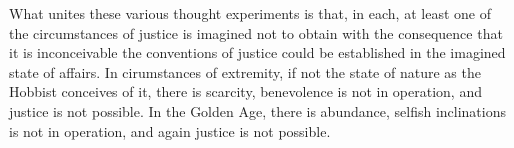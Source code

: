What unites these various thought experiments is that, in each, at least one of the circumstances of justice is imagined not to obtain with the consequence that it is inconceivable the conventions of justice could be established in the imagined state of affairs. In cirumstances of extremity, if not the state of nature as the Hobbist conceives of it, there is scarcity, benevolence is not in operation, and justice is not possible. In the Golden Age, there is abundance, selfish inclinations is not in operation, and again justice is not possible.

% 


